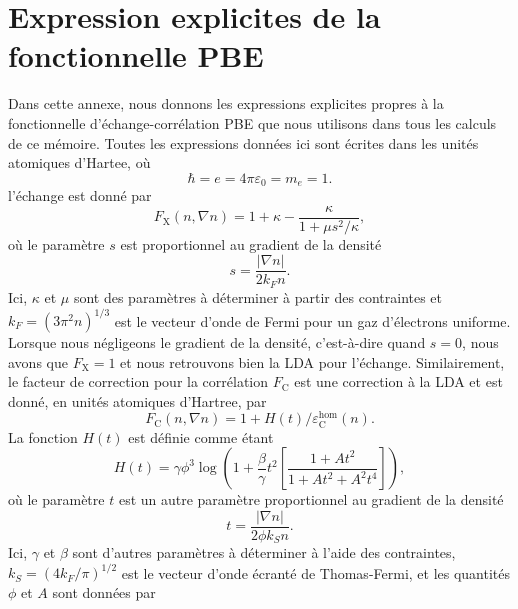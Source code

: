 \chapter{Expression explicites de la fonctionnelle PBE}\label{annexe:pbe}

Dans cette annexe, nous donnons les expressions explicites propres à la fonctionnelle d'échange-corrélation PBE \cite{perdewGeneralizedGradientApproximation1996a} que nous utilisons dans tous les calculs de ce mémoire. Toutes les expressions données ici sont écrites dans les unités atomiques d'Hartee, où
\begin{equation}
    \hbar = e = 4\pi\varepsilon_0 = m_e = 1.
    \label{eqn:a1_unités_hartree}
\end{equation}
l'échange est donné par
\begin{equation}
    F_\text{X}(n,\nabla n)=1+\kappa-\frac{\kappa}{1+\mu s^2/\kappa},
    \label{eqn:c1_FX}
\end{equation}
où le paramètre $s$ est proportionnel au gradient de la densité
\begin{equation}
    s=\frac{|\nabla n|}{2k_Fn}.
\end{equation}
Ici, $\kappa$ et $\mu$ sont des paramètres à déterminer à partir des contraintes et $k_F=(3\pi^2n)^{1/3}$ est le vecteur d'onde de Fermi pour un gaz d'électrons uniforme. Lorsque nous négligeons le gradient de la densité, c'est-à-dire quand $s=0$, nous avons que $F_\text{X}=1$ et nous retrouvons bien la LDA pour l'échange. Similairement, le facteur de correction pour la corrélation $F_\text{C}$ est une correction à la LDA et est donné, en unités atomiques d'Hartree, par
\begin{equation}
    \label{eqn:c1_FC}
    F_\text{C}(n,\nabla n) = 1+H(t)/\varepsilon_\text{C}^\text{hom}(n).
\end{equation}
La fonction $H(t)$ est définie comme étant
\begin{equation}
    H(t) = \gamma\phi^3\log\left(1+\frac{\beta}{\gamma}t^2\left[\frac{1+At^2}{1+At^2+A^2t^4}\right]\right),
    \label{eqn:c1_H(t)}
\end{equation}
où le paramètre $t$ est un autre paramètre proportionnel au gradient de la densité
\begin{equation}
    t = \frac{|\nabla n|}{2\phi k_Sn}.
\end{equation}
Ici, $\gamma$ et $\beta$ sont d'autres paramètres à déterminer à l'aide des contraintes, $k_S=(4k_F/\pi)^{1/2}$ est le vecteur d'onde écranté de Thomas-Fermi, et les quantités $\phi$ et $A$ sont données par
